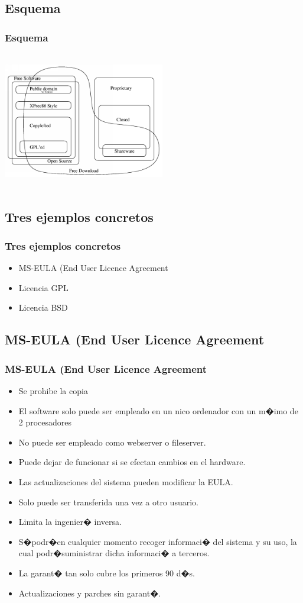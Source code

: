 \subsection{Esquema}
\frame
{
	\frametitle{Esquema}
	\begin{center}
	\includegraphics[width=200pt,height=170pt]{category.png}
	\end{center}

}
\subsection{Tres ejemplos concretos}
\frame
{
	\frametitle{Tres ejemplos concretos}
	\begin{itemize}
	\item MS-EULA (End User Licence Agreement
	\item Licencia GPL
	\item Licencia BSD
	\end{itemize}
}
\subsection{MS-EULA (End User Licence Agreement}
\frame
{
	\frametitle{MS-EULA (End User Licence Agreement}
	\begin{itemize}
	\item Se prohibe la copia
	\item El software solo puede ser empleado en un nico ordenador con un m�imo de 2 procesadores
	\item No puede ser empleado como webserver o fileserver.
	\item Puede dejar de funcionar si se efectan cambios en el hardware.
	\item Las actualizaciones del sistema pueden modificar la EULA.
	\item Solo puede ser transferida una vez a otro usuario.
	\item Limita la ingenier� inversa.
	\item S�podr�en cualquier momento recoger informaci� del sistema y su uso, la cual podr�suministrar dicha informaci� a terceros.
	\item La garant� tan solo cubre los primeros 90 d�s.
	\item Actualizaciones y parches sin garant�.
	\end{itemize}
}

